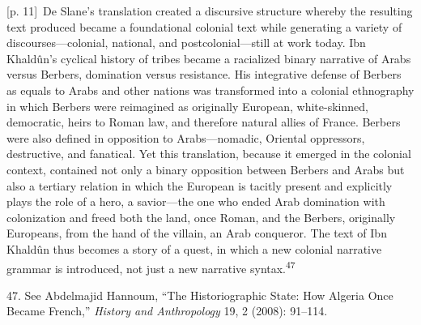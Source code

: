 \documentclass[10pt,a4paper]{article}
\begin{document}
{\scriptsize\color{gray} [p. 11]}\ De Slane’s translation created a discursive structure whereby the resulting text produced became a foundational colonial text while generating a variety of discourses—colonial, national, and postcolonial—still at work today. Ibn Khaldûn’s cyclical history of tribes became a racialized binary narrative of Arabs versus Berbers, domination versus resistance. His integrative defense of Berbers as equals to Arabs and other nations was transformed into a colonial ethnography in which Berbers were reimagined as originally European, white-skinned, democratic, heirs to Roman law, and therefore natural allies of France. Berbers were also defined in opposition to Arabs—nomadic, Oriental oppressors, destructive, and fanatical. Yet this translation, because it emerged in the colonial context, contained not only a binary opposition between Berbers and Arabs but also a tertiary relation in which the European is tacitly present and explicitly plays the role of a hero, a savior—the one who ended Arab domination with colonization and freed both the land, once Roman, and the Berbers, originally Europeans, from the hand of the villain, an Arab conqueror. The text of Ibn Khaldûn thus becomes a story of a quest, in which a new colonial narrative grammar is introduced, not just a new narrative syntax.\nobreak\textsuperscript{47}\par{\small 47. See Abdelmajid Hannoum, “The Historiographic State: How Algeria Once Became French,” \textit{History and Anthropology} 19, 2 (2008): 91–114.\par}
\end{document}
